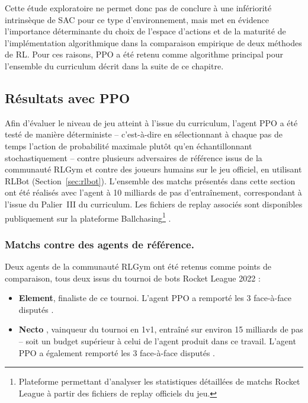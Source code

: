 Cette étude exploratoire ne permet donc pas de conclure à une infériorité intrinsèque de SAC pour ce type d'environnement, mais met en évidence l'importance déterminante du choix de l'espace d'actions et de la maturité de l'implémentation algorithmique dans la comparaison empirique de deux méthodes de RL. Pour ces raisons, PPO a été retenu comme algorithme principal pour l'ensemble du curriculum décrit dans la suite de ce chapitre.

\subsection{Résultats avec PPO}
\label{sec:ppo_results}

Afin d'évaluer le niveau de jeu atteint à l'issue du curriculum, l'agent PPO a été testé de manière déterministe -- c'est-à-dire en sélectionnant à chaque pas de temps l'action de probabilité maximale plutôt qu'en échantillonnant stochastiquement -- contre plusieurs adversaires de référence issus de la communauté RLGym et contre des joueurs humains sur le jeu officiel, en utilisant RLBot (Section~\ref{sec:rlbot}). L'ensemble des matchs présentés dans cette section ont été réalisés avec l'agent à 10 milliards de pas d'entraînement, correspondant à l'issue du Palier~III du curriculum. Les fichiers de replay associés sont disponibles publiquement sur la plateforme Ballchasing\footnote{Plateforme permettant d'analyser les statistiques détaillées de matchs Rocket League à partir des fichiers de replay officiels du jeu.} \parencite{BeepBoopV2Replays}.

\subsubsection{Matchs contre des agents de référence.}

Deux agents de la communauté RLGym ont été retenus comme points de comparaison, tous deux issus du tournoi de bots Rocket League 2022 \parencite{RLBotChampionship2022} :

\begin{itemize}
    \item \textbf{Element}, finaliste de ce tournoi. L'agent PPO a remporté les 3 face-à-face disputés \parencite{BeepBoopV2Replays}.
    \item \textbf{Necto} \parencite{rolv-arildRolvArildNecto2026}, vainqueur du tournoi en 1v1, entraîné sur environ 15 milliards de pas -- soit un budget supérieur à celui de l'agent produit dans ce travail. L'agent PPO a également remporté les 3 face-à-face disputés \parencite{BeepBoopV2Replays}.
\end{itemize}

